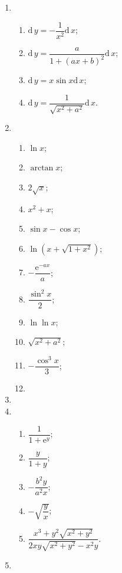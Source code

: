 \documentclass[a4paper, 11pt]{ctexart}
\newcommand{\dif}{\mathrm{d}\,}
\begin{document}
\pagestyle{empty}
\begin{enumerate}
    \item %
        \begin{enumerate}[(1)]
            \item %
                $\dif y = -\dfrac{1}{x^2}\dif x$;
            \item %
                $\dif y = \dfrac{a}{1 + (ax+b)^2}\dif x$;
            \item %
                $\dif y = x\sin x\dif x$;
            \item %
                $\dif y = \dfrac{1}{\sqrt{x^2 + a^2}}\dif x$.
        \end{enumerate}
    \item %
        \begin{enumerate}[(1)]
            \item %
                $\ln x$;
            \item %
                $\arctan x$;
            \item %
                $2\sqrt{x}$;
            \item %
                $x^2 + x$;
            \item %
                $\sin x - \cos x$;
            \item %
                $\ln(x + \sqrt{1+x^2})$;
            \item %
                $-\dfrac{\mathrm{e}^{-ax}}{a}$;
            \item %
                $\dfrac{\sin^2x}{2}$;
            \item %
                $\ln\ln x$;
            \item %
                $\sqrt{x^2 + a^2}$;
            \item %
                $-\dfrac{\cos^3x}{3}$;
            \item %
        \end{enumerate}
    \item %
    \item %
        \begin{enumerate}[(1)]
            \item %
                $\dfrac{1}{1 + \mathrm{e}^y}$;
            \item %
                $\dfrac{y}{1 + y}$;
            \item %
                $-\dfrac{b^2y}{a^2x}$;
            \item %
                $-\sqrt{\dfrac yx}$;
            \item %
                $\dfrac{x^3 + y^2\sqrt{x^2+y^2}}{2xy\sqrt{x^2+y^2} - x^2y}$.
        \end{enumerate}
    \item %
\end{enumerate}
\end{document}
